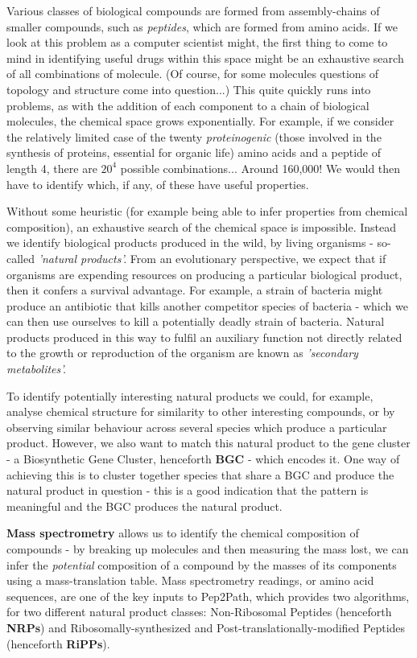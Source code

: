 \documentclass{l4proj}
\begin{document}
Various classes of biological compounds are formed from assembly-chains of smaller compounds, such as \textit{peptides}, which are formed from amino acids.
If we look at this problem as a computer scientist might, the first thing to come to mind in identifying useful drugs within this space might be an exhaustive search of all combinations of molecule.
(Of course, for some molecules questions of topology and structure come into question...)
This quite quickly runs into problems, as with the addition of each component to a chain of biological molecules, the chemical space grows exponentially.
For example, if we consider the relatively limited case of the twenty \textit{proteinogenic} (those involved in the synthesis of proteins, essential for organic life) amino acids and a peptide of length 4, there are \(20^4\) possible combinations... Around 160,000! We would then have to identify which, if any, of these have useful properties.

Without some heuristic (for example being able to infer properties from chemical composition), an exhaustive search of the chemical space is impossible.
Instead we identify biological products produced in the wild, by living organisms - so-called \textit{'natural products'.}
From an evolutionary perspective, we expect that if organisms are expending resources on producing a particular biological product, then it confers a survival advantage.
For example, a strain of bacteria might produce an antibiotic that kills another competitor species of bacteria - which we can then use ourselves to kill a potentially deadly strain of bacteria.
Natural products produced in this way to fulfil an auxiliary function not directly related to the growth or reproduction of the organism are known as \textit{'secondary metabolites'.}

To identify potentially interesting natural products we could, for example, analyse chemical structure for similarity to other interesting compounds, or by observing similar behaviour across several species which produce a particular product. 
However, we also want to match this natural product to the gene cluster - a Biosynthetic Gene Cluster, henceforth \textbf{BGC} - which encodes it.
One way of achieving this is to cluster together species that share a BGC and produce the natural product in question - this is a good indication that the pattern is meaningful and the BGC produces the natural product.

\textbf{Mass spectrometry} allows us to identify the chemical composition of compounds - by breaking up molecules and then measuring the mass lost, we can infer the \textit{potential} composition of a compound by the masses of its components using a mass-translation table. Mass spectrometry readings, or amino acid sequences, are one of the key inputs to Pep2Path, which provides two algorithms, for two different natural product classes: Non-Ribosomal Peptides (henceforth \textbf{NRPs}) and Ribosomally-synthesized and Post-translationally-modified Peptides (henceforth \textbf{RiPPs}). 
\end{document}
